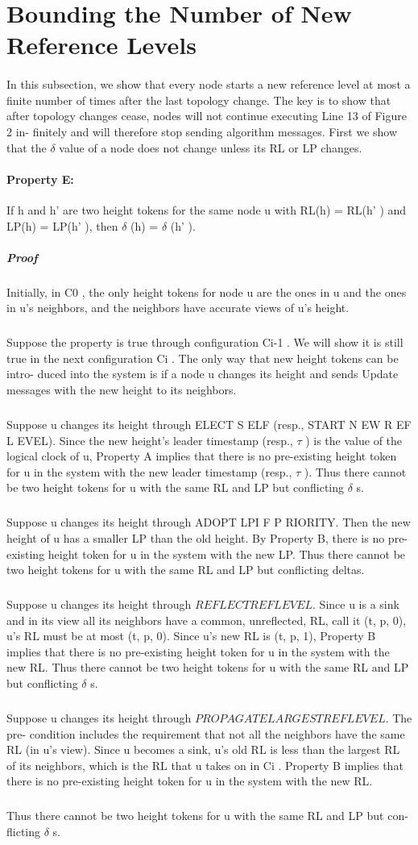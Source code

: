 \section{Bounding the Number of New Reference Levels}
\paragraph{}In this subsection, we show that every node starts a new reference level at most a finite number of times after the last topology change. The key is to show that after topology changes cease, nodes will not continue executing Line 13 of Figure 2 in- finitely and will therefore stop sending algorithm messages. First we show that the $\delta$ value of a node does not change unless its RL or LP changes.
\paragraph{Property E:}If h and h' are two height tokens for the same node u with RL(h) = RL(h' ) and LP(h) = LP(h' ), then $\delta$ (h) = $\delta$ (h' ).
\subparagraph{Proof}Initially, in C0 , the only height tokens for node u are the ones in u and the ones in u's neighbors, and the neighbors have accurate views of u's height.
\subparagraph{}Suppose the property is true through configuration Ci-1 . We will show it is still true in the next configuration Ci . The only way that new height tokens can be intro- duced into the system is if a node u changes its height and sends Update messages with the new height to its neighbors.
\subparagraph{}Suppose u changes its height through ELECT S ELF (resp., START N EW R EF L EVEL). Since the new height's leader timestamp (resp., $\tau$ ) is the value of the logical clock of u, Property A implies that there is no pre-existing height token for u in the system with the new leader timestamp (resp., $\tau$ ). Thus there cannot be two height tokens for u with the same RL and LP but conflicting $\delta$ s.
\subparagraph{}Suppose u changes its height through ADOPT LPI F P RIORITY. Then the new height of u has a smaller LP than the old height. By Property B, there is no pre-existing height token for u in the system with the new LP. Thus there cannot be two height tokens for u with the same RL and LP but conflicting deltas.
\subparagraph{}Suppose u changes its height through $REFLECTREFLEVEL$. Since u is a sink and in its view all its neighbors have a common, unreflected, RL, call it (t, p, 0), u's RL must be at most (t, p, 0). Since u's new RL is (t, p, 1), Property B implies that there is no pre-existing height token for u in the system with the new RL. Thus there cannot be two height tokens for u with the same RL and LP but conflicting $\delta$ s. 
\subparagraph{}Suppose u changes its height through $PROPAGATELARGESTREFLEVEL$. The pre- condition includes the requirement that not all the neighbors have the same RL (in u's view). Since u becomes a sink, u's old RL is less than the largest RL of its neighbors, which is the RL that u takes on in Ci . Property B implies that there is no pre-existing height token for u in the system with the new RL. 
\subparagraph{}Thus there cannot be two height tokens for u with the same RL and LP but con- flicting $\delta$ s.

